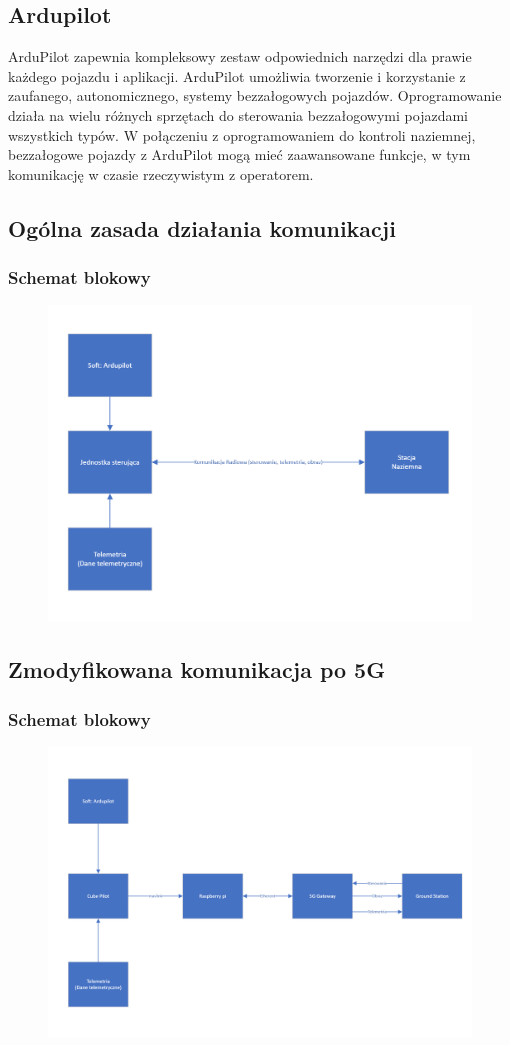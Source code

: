 \documentclass{article}
\begin{document}
\subsection{Ardupilot}
ArduPilot zapewnia kompleksowy zestaw odpowiednich narzędzi dla prawie każdego pojazdu i aplikacji. ArduPilot umożliwia tworzenie i korzystanie z zaufanego, autonomicznego, systemy bezzałogowych pojazdów. 
Oprogramowanie działa na wielu różnych sprzętach do sterowania bezzałogowymi pojazdami wszystkich typów. W połączeniu z oprogramowaniem do kontroli naziemnej, bezzałogowe pojazdy z ArduPilot mogą mieć zaawansowane funkcje, w tym komunikację w czasie rzeczywistym z operatorem.
\subsection{Ogólna zasada działania komunikacji}
\subsubsection{Schemat blokowy}
\begin{figure}[H]
    \centering
    \includegraphics[width=0.7 \textwidth]{ogolna.png}
    \label{fig:obraz1}
\end{figure}

\subsection{Zmodyfikowana komunikacja po 5G}
\subsubsection{Schemat blokowy}
\begin{figure}[H]
    \centering
    \includegraphics[width=0.7 \textwidth]{po.png}
    \label{fig:obraz2}
\end{figure}
\end{document}
